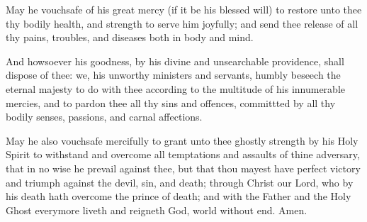 


\centerline{}

May he %
vouchsafe of his great mercy (if it be his blessed will) to restore unto thee thy bodily health, and strength to serve him joyfully; and send thee release of all thy pains, troubles, and diseases both in body and mind.
\begin{leftbar}
And howsoever his goodness, by his divine and unsearchable providence, shall dispose of thee: we, his unworthy ministers and servants, humbly beseech the eternal majesty to do with thee according to the multitude of his innumerable mercies, and to pardon thee all thy sins and offences, committted by all thy bodily senses, passions, and carnal affections.
\end{leftbar}

May he %
also vouchsafe mercifully to grant unto thee ghostly strength by his Holy Spirit to withstand and overcome all temptations and assaults of thine adversary, that in no wise he prevail against thee, but that thou mayest have perfect victory and triumph against the devil, sin, and death; through Christ our Lord, who by his death hath overcome the prince of death; and with the Father and the Holy Ghost everymore liveth and reigneth God, world without end.  \R Amen.



